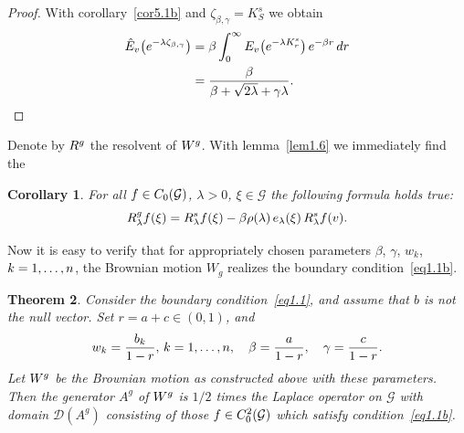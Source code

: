 \documentclass[11pt,a4paper]{amsart}
\newcommand{\gb}{\beta}
\renewcommand{\gg}{\gamma}
\newcommand{\gl}{\lambda}
\newcommand{\cD}{\mathcal{D}}
\newcommand{\cG}{\mathcal{G}}
\newcommand{\1}{1}
\newtheorem{theorem}{Theorem}[section]
\newtheorem{corollary}[theorem]{Corollary}
\theoremstyle{remark}
\newcommand{\sgl}{\ensuremath\sqrt{2\gl}}
\newcommand{\Co}{\ensuremath C_0(\cG)}
\newcommand{\Cii}{\ensuremath C_0^2(\cG)}
\newcommand{\kn}{\ensuremath k=1,\dotsc,n}
\newcommand{\RsW}{\ensuremath R^s}
\newcommand{\Wg}{\ensuremath W^g}
\newcommand{\Rg}{\ensuremath R^g}
\newcommand{\hE}{\ensuremath{\hat E}}
\numberwithin{equation}{section}
\begin{document}
\begin{proof}
With corollary~\ref{cor5.1b} and $\zeta_{\gb,\gg} = K^s_S$ we obtain
\begin{align*}
    \hE_v\bigl(e^{-\gl \zeta_{\gb,\gg}}\bigr)
        &= \gb \int_0^\infty E_v\bigl(e^{-\gl K^s_r}\bigr)\,e^{-\gb r}\,dr\\
	   &= \frac{\gb}{\gb + \sgl + \gg \gl}.	\qedhere
\end{align*}
\end{proof}

Denote by $\Rg$ the resolvent of $\Wg$. With lemma~\ref{lem1.6} we immediately find
the

\begin{corollary}   \label{cor5.3}
For all $f\in\Co$, $\gl>0$, $\xi\in\cG$ the following formula holds true:
\begin{equation}    \label{eq5.4}
    \Rg_\gl f(\xi)
        = \RsW_\gl f(\xi) - \gb\rho(\gl)\,e_\gl(\xi)\,\RsW_\gl f(v).
\end{equation}
\end{corollary}

Now it is easy to verify that for appropriately chosen parameters $\gb$, $\gg$,
$w_k$, $\kn$, the Brownian motion $W_g$ realizes the boundary
condition~\eqref{eq1.1b}.

\begin{theorem} \label{thm5.4}
Consider the boundary condition~\eqref{eq1.1}, and assume that $b$ is not the null
vector. Set $r=a+c\in(0,1)$, and
\begin{equation}    \label{eq5.5a}
    w_k = \frac{b_k}{1-r},\,\kn,\quad \gb = \frac{a}{1-r},\quad \gg = \frac{c}{1-r}.
\end{equation}
Let $\Wg$ be the Brownian motion as constructed above with these parameters.
Then the generator $A^g$ of $\Wg$ is $1/2$ times the Laplace operator on $\cG$ with domain
$\cD(A^g)$ consisting of those $f\in\Cii$ which satisfy condition~\eqref{eq1.1b}.
\end{theorem}
\end{document}
